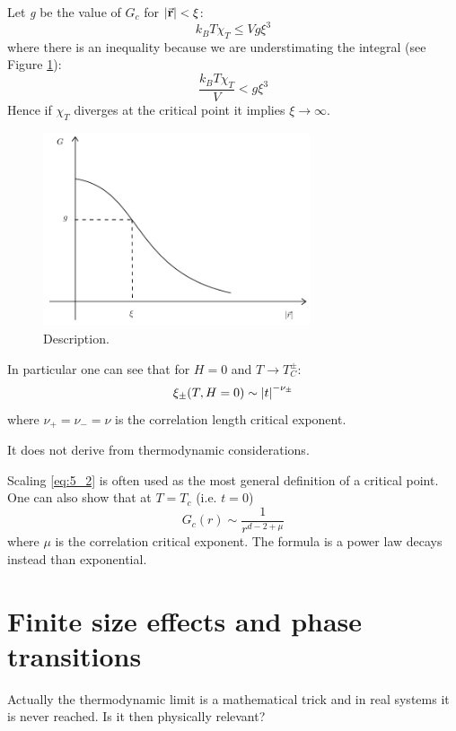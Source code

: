 \documentclass[../main/main.tex]{subfiles}
\begin{document}
Let \emph{g} be the value of \( G_c \) for \( \abs{\va{r}} < \xi \):
\begin{equation}
  k_B T \chi _T \le V g \xi ^3
\end{equation}
where there is an inequality because we are understimating the integral (see Figure \ref{fig:5_1}):
\begin{equation}
  \frac{k_B T \chi _T}{V} < g \xi ^3
\end{equation}
Hence if \( \chi _T \) diverges at the critical point it implies \( \xi \rightarrow \infty  \).
\begin{figure}[h!]
\centering
\includegraphics[width=0.7\textwidth]{../lessons/5_image/1.pdf}
\caption{\label{fig:5_1} Description.}
\end{figure}
In particular one can see that for \( H=0 \) and \( T \rightarrow T_C^\pm \):
\begin{equation}
  \xi _\pm (T,H=0) \sim \abs{t}^{- \nu _\pm}
  \label{eq:5_2}
\end{equation}
where \( \nu _+ = \nu _- = \nu  \) is the correlation length critical exponent.
\begin{remark}
It does not derive from thermodynamic considerations.
\end{remark}
Scaling \eqref{eq:5_2} is often used as the most general definition of a critical point. One can also show that at \( T=T_c \) (i.e. \( t=0 \))
\begin{equation}
  G_c (r) \sim \frac{1}{r^{d-2+\mu }}
\end{equation}
where \( \mu  \) is the correlation critical exponent. The formula is a power law decays instead than exponential.

\section{Finite size effects and phase transitions}
Actually the thermodynamic limit is a mathematical trick and in real systems it is never reached. Is it then physically relevant?
\end{document}
